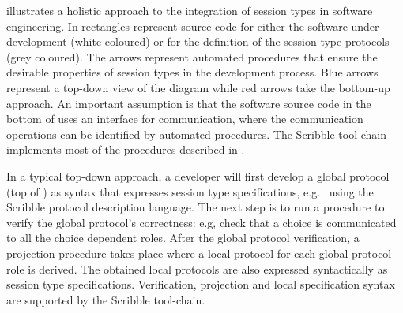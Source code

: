  illustrates a holistic approach to the integration of session
types in software engineering.
In  rectangles
represent source code for either the software
under development (white coloured) or for the definition
of the session type protocols (grey coloured).
The arrows
represent automated procedures that ensure
the desirable properties of session types
in the development process. Blue arrows represent
a top-down view of the diagram while red arrows take
the bottom-up approach.
An important assumption
is that the software source code in the
bottom of  uses an interface
for communication, where the communication
operations can be identified by automated
procedures.
%
The Scribble tool-chain implements
most of the procedures described in .







In a typical top-down approach, a developer will first develop
a global protocol (top of )
as syntax that expresses session type specifications,
e.g.\ 
using the Scribble protocol description language.
The next step is to run a procedure to verify the
global protocol's correctness: e.g, check that a choice
is communicated to all the choice dependent roles.
After the global protocol verification, a projection
procedure takes place where a local protocol
for each global protocol role is derived.
The obtained local protocols are also expressed
syntactically as session type specifications.
Verification, projection and local specification
syntax are supported by the Scribble tool-chain.

